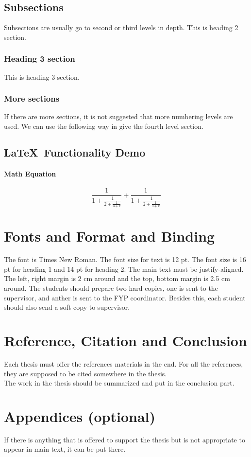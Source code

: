 \documentclass[12pt]{article}
\begin{document}
\subsection{Subsections}
Subsections are usually go to second or third levels in depth. This is heading 2 section.
\subsubsection{Heading 3 section}
This is heading 3 section.
\subsubsection{More sections}
If there are more sections, it is not suggested that more numbering levels are used. We can use the following way in give the fourth level section.
\subsection{\LaTeX~Functionality Demo}
\paragraph{Math Equation}
\begin{equation}
    \frac{1}{\displaystyle 1+
    \frac{1}{\displaystyle 2+
    \frac{1}{\displaystyle 3+x}}} +
    \frac{1}{1+\frac{1}{2+\frac{1}{3+x}}}
\end{equation}


\section{Fonts and Format and Binding}
The font is Times New Roman. The font size for text is 12 pt. The font size is 16 pt for heading 1 and 14 pt for heading 2. The main text must be justify-aligned. The left, right margin is 2 cm around and the top, bottom margin is 2.5 cm around. The students should prepare two hard copies, one is sent to the supervisor, and anther is sent to the FYP coordinator. Besides this, each student should also send a soft copy to supervisor.\cite{Gusfield:97}\par

\section{Reference, Citation and Conclusion}
Each thesis must offer the references materials in the end. For all the references, they are supposed to be cited somewhere in the thesis.\\
The work in the thesis should be summarized and put in the conclusion part.\cite{APA:83}




\section*{Appendices (optional)}
If there is anything that is offered to support the thesis but is not appropriate to appear in main text, it can be put there.
\end{document}
